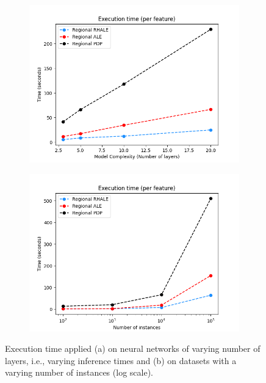 \documentclass[sigconf, nonacm]{acmart}
\begin{document}
\begin{figure}
  \centering
  \begin{subfigure}[t]{0.235\textwidth}
  \centering
  \includegraphics[width=\linewidth]{figures/simulation_2/efficiency_layers.png}
  \caption{}
  \label{fig:efficiency_heavy_model}
  \end{subfigure}
  \begin{subfigure}[t]{0.235\textwidth}
  \centering
  \includegraphics[width=\linewidth]{figures/simulation_2/efficiency_samples.png}
  \caption{}
  \label{fig:efficiency_nof_instances}
  \end{subfigure}
  \caption{Execution time applied (a) on neural networks of varying number of layers, i.e., varying inference times and (b) on datasets with a varying number of instances (log scale).}
\end{figure}
\end{document}
